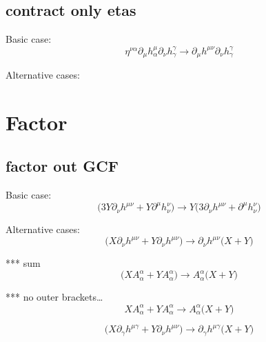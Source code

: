 \documentclass{article}
\def\){\Big)}
\def\({\Big(}
\begin{document}

 \subsection{contract only etas}

Basic case:
\begin{equation}
\eta^{\nu \alpha} \partial_{\mu} h^{\mu}_{\alpha}\partial_{\nu} h^{\gamma}_{\gamma} 	 \rightarrow  \partial_{\mu}h^{\mu \nu} \partial_{\nu}h_{\gamma}^{\gamma}
\end{equation}

Alternative cases:












\section{Factor}


 \subsection{factor out GCF}

Basic case: 
\begin{equation}
 \(3Y \partial_{\nu}h^{\mu \nu} + Y \partial^{\mu} h^{\nu }_{\nu}\) \rightarrow
 Y \(3 \partial_{\nu}h^{\mu \nu} + \partial^{\mu}h_{\nu}^{\nu} \)
\end{equation}

Alternative cases:
\begin{equation}
\(X \partial_{\nu}h^{\mu \nu} + Y \partial_{\nu} h^{\mu \nu}\) \rightarrow
\partial_{\nu}h^{\mu \nu} \(X +Y \)
\end{equation}

*** sum
\begin{equation}
\(X A^{\alpha}_{\alpha} + Y A^{\alpha}_{\alpha}\) \rightarrow
A_{\alpha}^{\alpha} \(X +Y \)
\end{equation}

***  no outer brackets…
\begin{equation}
X A^{\alpha}_{\alpha} + Y A^{\alpha}_{\alpha}  \rightarrow
A_{\alpha}^{\alpha} \(X +Y \)
\end{equation}

\begin{equation}
\(X \partial_{\gamma}h^{\mu \gamma} + Y \partial_{\nu} h^{\mu \nu}\) \rightarrow
\partial_{\gamma}h^{\mu \gamma} \(X +Y \)
\end{equation}
\end{document}
